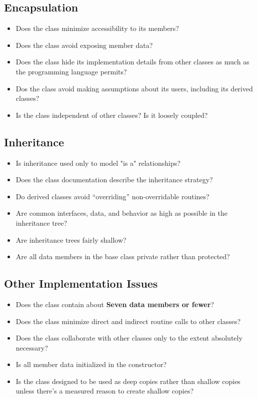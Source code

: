 \subsection{Encapsulation}
\begin{itemize}
\item Does the class minimize accessibility to its members?
\item Does the class avoid exposing member data?
\item Does the class hide its implementation details from other classes as much as the programming language permits?
\item Dos the class avoid making assumptions about its users, including its derived classes?
\item Is the class independent of other classes? Is it loosely coupled?
\end{itemize}

\subsection{Inheritance}
\begin{itemize}
\item Is inheritance used only to model "is a" relationships?
\item Does the class documentation describe the inheritance strategy?
\item Do derived classes avoid “overriding” non-overridable routines? 
\item Are common interfaces, data, and behavior as high as possible in the inheritance tree? 
\item Are inheritance trees fairly shallow? 
\item Are all data members in the base class private rather than protected? 
\end{itemize}

\subsection{Other Implementation Issues}
\begin{itemize}
\item Does the class contain about \textbf{Seven data members or fewer}?
\item Does the class minimize direct and indirect routine calls to other classes?
\item Does the class collaborate with other classes only to the extent absolutely necessary? 
\item Is all member data initialized in the constructor? 
\item Is the class designed to be used as deep copies rather than shallow copies unless there’s a measured reason to create shallow copies? 
\end{itemize}

